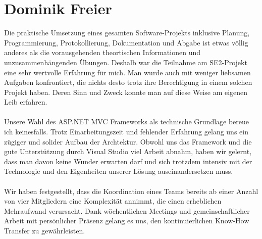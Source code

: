 	\section{Dominik Freier}
	Die praktische Umsetzung eines gesamten Software-Projekts inklusive Planung, Programmierung, Protokollierung, Dokumentation und Abgabe ist etwas völlig anderes als die vorausgehenden theortischen Informationen und unzusammenhängenden Übungen. Deshalb war die Teilnahme am SE2-Projekt eine sehr wertvolle Erfahrung für mich. Man wurde auch mit weniger liebsamen Aufgaben konfrontiert, die nichts desto trotz ihre Berechtigung in einem solchen Projekt haben. Deren Sinn und Zweck konnte man auf diese Weise am eigenen Leib erfahren.\\ \\
	Unsere Wahl des ASP.NET MVC Frameworks als technische Grundlage bereue ich keinesfalls. Trotz Einarbeitungszeit und fehlender Erfahrung gelang uns ein zügiger und solider Aufbau der Archtektur. Obwohl uns das Framework und die gute Unterstützung durch Visual Studio  viel Arbeit abnahm, haben wir gelernt, dass man davon keine Wunder erwarten darf und sich trotzdem intensiv mit der Technologie und den Eigenheiten unserer Lösung auseinandersetzen muss.\\ \\
	Wir haben festgestellt, dass die Koordination eines Teams bereits ab einer Anzahl von vier Mitgliedern eine Komplexität annimmt,  die einen erheblichen Mehraufwand verursacht. Dank wöchentlichen Meetings und gemeinschaftlicher Arbeit mit persönlicher Präsenz gelang es uns, den kontinuierlichen Know-How Transfer zu gewährleisten. 